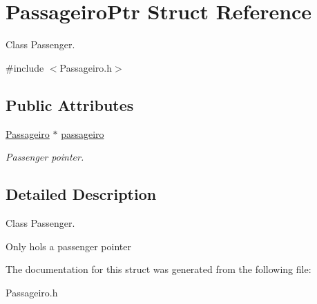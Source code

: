 \hypertarget{struct_passageiro_ptr}{}\section{Passageiro\+Ptr Struct Reference}
\label{struct_passageiro_ptr}


Class Passenger.  




{\ttfamily \#include $<$Passageiro.\+h$>$}

\subsection*{Public Attributes}
\begin{DoxyCompactItemize}
\item 
\mbox{\label{struct_passageiro_ptr_afa262bf83b00a686082723ec1223ae28}} 
\hyperlink{class_passageiro}{Passageiro} $\ast$ \hyperlink{struct_passageiro_ptr_afa262bf83b00a686082723ec1223ae28}{passageiro}
\begin{DoxyCompactList}\small\item\em Passenger pointer. \end{DoxyCompactList}\end{DoxyCompactItemize}


\subsection{Detailed Description}
Class Passenger. 

Only hols a passenger pointer 

The documentation for this struct was generated from the following file\+:\begin{DoxyCompactItemize}
\item 
Passageiro.\+h\end{DoxyCompactItemize}
